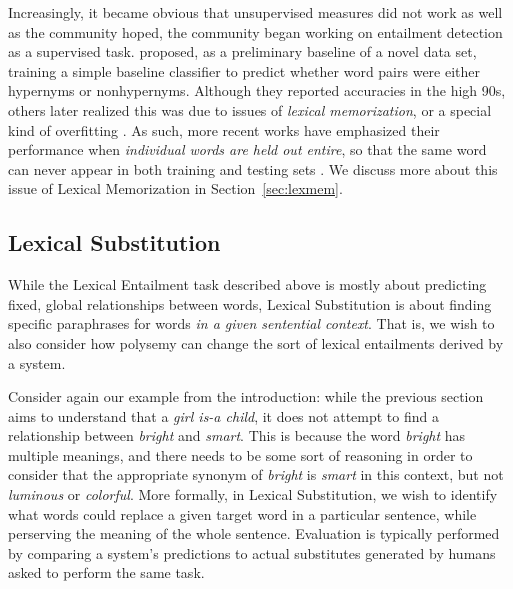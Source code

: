 \documentclass[letterpaper]{article}
\begin{document}
Increasingly, it became obvious that unsupervised measures did not work
as well as the community hoped, the community began working
on entailment detection as a supervised task. 
proposed, as a preliminary baseline of a novel data set, training a simple
baseline classifier to predict whether word pairs were either hypernyms or
nonhypernyms. Although they reported accuracies in the high 90s, others later
realized this was due to issues of {\em lexical memorization}, or a special
kind of overfitting
\cite{roller:2014:coling,weeds:2014:coling,levy:2015:naacl}. As such, more
recent works have emphasized their performance when {\em individual words are
held out entire}, so that the same word can never appear in both training and
testing sets \cite{roller:2014:coling,kruszewski:2015:tacl,levy:2015:naacl}.
We discuss more about this issue of Lexical Memorization in
Section~\ref{sec:lexmem}.

\subsection{Lexical Substitution}
\label{sec:lexsub}

While the Lexical Entailment task described above is mostly about predicting
fixed, global relationships between words, Lexical Substitution is about
finding specific paraphrases for words {\em in a given sentential context}.
That is, we wish to also consider how polysemy can change the sort of
lexical entailments derived by a system.

Consider again our example from the introduction: while the previous section
aims to understand that a {\em girl is-a child}, it does not attempt to find a
relationship between {\em bright} and {\em smart}. This is because the word
{\em bright} has multiple meanings, and there needs to be some sort of
reasoning in order to consider that the appropriate synonym of {\em bright}
is {\em smart} in this context, but not {\em luminous} or {\em colorful}.
More formally, in Lexical Substitution, we wish to identify what
words could replace a given target word in a particular sentence, while
perserving the meaning of the whole sentence. Evaluation is typically
performed by comparing a system's predictions to actual substitutes generated
by humans asked to perform the same task.
\end{document}
